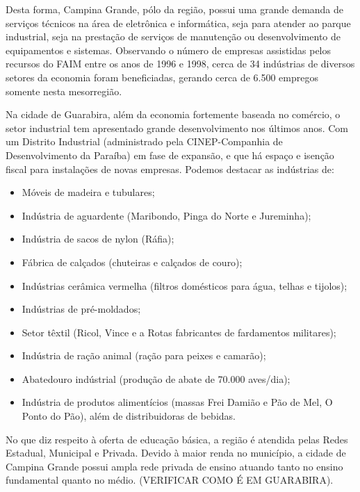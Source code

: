 	Desta forma, Campina Grande, pólo da região, possui uma grande demanda de serviços técnicos na área de eletrônica e inform\'atica, seja para atender ao parque industrial, seja na prestação de serviços de manutenção ou desenvolvimento de equipamentos e sistemas. Observando o número de empresas assistidas pelos recursos do FAIM entre os anos de 1996 e 1998, cerca de 34 indústrias de diversos setores da economia foram beneficiadas, gerando cerca de 6.500 empregos somente nesta mesorregião.

	Na cidade de Guarabira, além da economia fortemente baseada no comércio, o setor industrial tem apresentado grande desenvolvimento nos últimos anos. Com um Distrito Industrial (administrado pela CINEP-Companhia de Desenvolvimento da Paraíba) em fase de expansão, e que há espaço e isenção fiscal para instalações de novas empresas. Podemos destacar as indústrias de: 

\begin{itemize}

	\item Móveis de madeira e tubulares;
	\item Indústria de aguardente (Maribondo, Pinga do Norte e Jureminha);
	\item Indústria de sacos de nylon (Ráfia); 
	\item Fábrica de calçados (chuteiras e calçados de couro); 
	\item Indústrias cerâmica vermelha (filtros domésticos para água, telhas e tijolos); 
	\item Indústrias de pré-moldados; 
	\item Setor têxtil (Ricol, Vince e a Rotas fabricantes de fardamentos militares); 
	\item Indústria de ração animal (ração para peixes e camarão); 
	\item Abatedouro indústrial (produção de abate de 70.000 aves/dia); 
	\item Ind\'ustria de produtos alimentícios (massas Frei Damião e Pão de Mel, O Ponto do Pão), além de distribuidoras de bebidas.

\end{itemize}


	No que diz respeito à oferta de educação básica, a região é atendida pelas Redes Estadual, Municipal e Privada. Devido à maior renda no município, a cidade de Campina Grande possui ampla rede privada de ensino atuando tanto no ensino fundamental quanto no médio. (VERIFICAR COMO \'E EM GUARABIRA).

